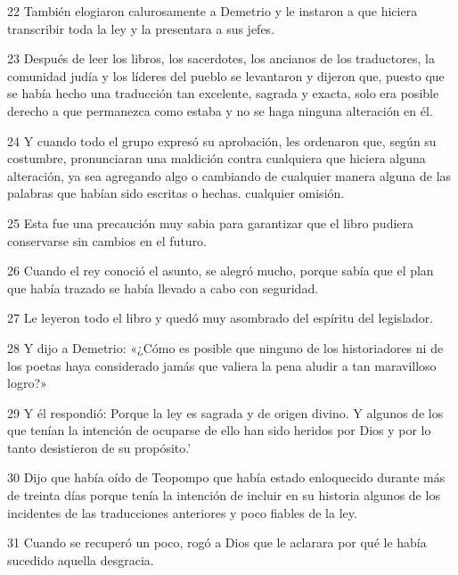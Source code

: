 \par 22 También elogiaron calurosamente a Demetrio y le instaron a que hiciera transcribir toda la ley y la presentara a sus jefes.

\par 23 Después de leer los libros, los sacerdotes, los ancianos de los traductores, la comunidad judía y los líderes del pueblo se levantaron y dijeron que, puesto que se había hecho una traducción tan excelente, sagrada y exacta, solo era posible derecho a que permanezca como estaba y no se haga ninguna alteración en él.

\par 24 Y cuando todo el grupo expresó su aprobación, les ordenaron que, según su costumbre, pronunciaran una maldición contra cualquiera que hiciera alguna alteración, ya sea agregando algo o cambiando de cualquier manera alguna de las palabras que habían sido escritas o hechas. cualquier omisión.

\par 25 Esta fue una precaución muy sabia para garantizar que el libro pudiera conservarse sin cambios en el futuro.

\par 26 Cuando el rey conoció el asunto, se alegró mucho, porque sabía que el plan que había trazado se había llevado a cabo con seguridad.

\par 27 Le leyeron todo el libro y quedó muy asombrado del espíritu del legislador.

\par 28 Y dijo a Demetrio: «¿Cómo es posible que ninguno de los historiadores ni de los poetas haya considerado jamás que valiera la pena aludir a tan maravilloso logro?»

\par 29 Y él respondió: Porque la ley es sagrada y de origen divino. Y algunos de los que tenían la intención de ocuparse de ello han sido heridos por Dios y por lo tanto desistieron de su propósito.'

\par 30 Dijo que había oído de Teopompo que había estado enloquecido durante más de treinta días porque tenía la intención de incluir en su historia algunos de los incidentes de las traducciones anteriores y poco fiables de la ley.

\par 31 Cuando se recuperó un poco, rogó a Dios que le aclarara por qué le había sucedido aquella desgracia.


